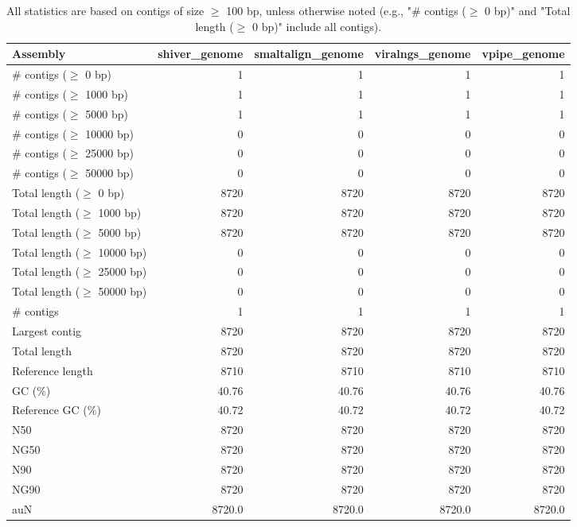 \documentclass[12pt,a4paper]{article}
\begin{document}
\begin{table}[ht]
\begin{center}
\caption{All statistics are based on contigs of size $\geq$ 100 bp, unless otherwise noted (e.g., "\# contigs ($\geq$ 0 bp)" and "Total length ($\geq$ 0 bp)" include all contigs).}
\begin{tabular}{|l*{4}{|r}|}
\hline
Assembly & shiver\_genome & smaltalign\_genome & viralngs\_genome & vpipe\_genome \\ \hline
\# contigs ($\geq$ 0 bp) & 1 & 1 & 1 & 1 \\ \hline
\# contigs ($\geq$ 1000 bp) & 1 & 1 & 1 & 1 \\ \hline
\# contigs ($\geq$ 5000 bp) & 1 & 1 & 1 & 1 \\ \hline
\# contigs ($\geq$ 10000 bp) & 0 & 0 & 0 & 0 \\ \hline
\# contigs ($\geq$ 25000 bp) & 0 & 0 & 0 & 0 \\ \hline
\# contigs ($\geq$ 50000 bp) & 0 & 0 & 0 & 0 \\ \hline
Total length ($\geq$ 0 bp) & 8720 & 8720 & 8720 & 8720 \\ \hline
Total length ($\geq$ 1000 bp) & 8720 & 8720 & 8720 & 8720 \\ \hline
Total length ($\geq$ 5000 bp) & 8720 & 8720 & 8720 & 8720 \\ \hline
Total length ($\geq$ 10000 bp) & 0 & 0 & 0 & 0 \\ \hline
Total length ($\geq$ 25000 bp) & 0 & 0 & 0 & 0 \\ \hline
Total length ($\geq$ 50000 bp) & 0 & 0 & 0 & 0 \\ \hline
\# contigs & 1 & 1 & 1 & 1 \\ \hline
Largest contig & 8720 & 8720 & 8720 & 8720 \\ \hline
Total length & 8720 & 8720 & 8720 & 8720 \\ \hline
Reference length & 8710 & 8710 & 8710 & 8710 \\ \hline
GC (\%) & 40.76 & 40.76 & 40.76 & 40.76 \\ \hline
Reference GC (\%) & 40.72 & 40.72 & 40.72 & 40.72 \\ \hline
N50 & 8720 & 8720 & 8720 & 8720 \\ \hline
NG50 & 8720 & 8720 & 8720 & 8720 \\ \hline
N90 & 8720 & 8720 & 8720 & 8720 \\ \hline
NG90 & 8720 & 8720 & 8720 & 8720 \\ \hline
auN & 8720.0 & 8720.0 & 8720.0 & 8720.0 \\ \hline

\end{tabular}
\end{center}
\end{table}
\end{document}
